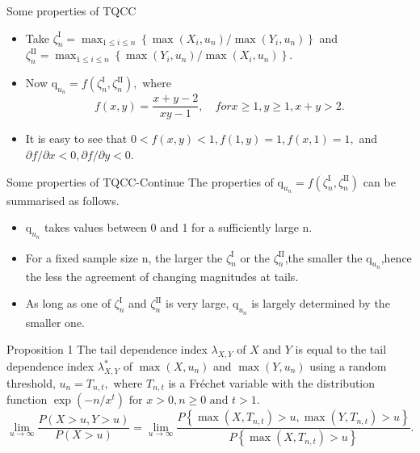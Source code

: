 \documentclass[12pt]{beamer}
\begin{document}
\begin{frame}{Some properties of TQCC}
\begin{itemize}
\item Take $\zeta_{n}^{\mathrm{I}}=\max _{1 \leq i \leq n}\left\{\max \left(X_{i}, u_{n}\right) / \max \left(Y_{i}, u_{n}\right)\right\}$ and $\zeta_{n}^{\mathrm{II}}=\max _{1 \leq i \leq n}\left\{\max \left(Y_{i}, u_{n}\right) / \max \left(X_{i}, u_{n}\right)\right\}$.
\vspace{2ex}
\item Now $\mathrm{q}_{u_{n}}=f\left(\zeta_{n}^{\mathrm{I}}, \zeta_{n}^{\mathrm{II}}\right),$ where
\begin{displaymath}
f(x, y)=\frac{x+y-2}{x y-1}, \quad for x \geq 1, y \geq 1, x+y>2.
\end{displaymath}
\vspace{2ex}
\item It is easy to see that $0<f(x, y)<1, f(1, y)=1, f(x, 1)=1,$ and $\partial f / \partial x <0, \partial f / \partial y <0$.
\end{itemize}
\end{frame}




\begin{frame}{Some properties of TQCC-Continue}
The properties of $\mathrm{q}_{u_{n}}=f \left(\zeta_{n}^{\mathrm{I}}, \zeta_{n}^{\mathrm{II}}\right)$ can be summarised as follows.
\begin{itemize}
\item $\mathrm{q}_{u_{n}}$ takes values between 0 and 1
for a sufficiently large n.
\item For a fixed sample size n, the larger the $\zeta_{n}^{\mathrm{I}}$ or the $\zeta_{n}^{\mathrm{II}}$,the smaller
the $\mathrm{q}_{u_{n}}$,hence the less the agreement of changing magnitudes at tails.
\item As long as one of $\zeta_{n}^{\mathrm{I}}$ and $\zeta_{n}^{\mathrm{II}}$ is very large, $\mathrm{q}_{u_{n}}$ is largely determined by the smaller one.

\end{itemize}
\end{frame}


\begin{frame}{Proposition 1}
The tail dependence index $\lambda_{X,Y}$ of $X$ and $Y$ is equal to the tail dependence index $\lambda^*_{X,Y}$ of $\max \left(X, u_{n}\right)$ and $\max \left(Y, u_{n}\right)$ using a random threshold, $u_n=T_{n,t},$ where $T_{n,t}$ is a Fréchet variable with the distribution function $\exp \left(-n / x^{t}\right) \text { for } x>0, n \geq 0 \text { and } t>1.$
$$\lim _{u \rightarrow \infty} \frac{P(X>u, Y>u)}{P(X>u)}=\lim _{u \rightarrow \infty} \frac{P\left\{\max \left(X, T_{n, t}\right)>u, \max \left(Y, T_{n, t}\right)>u\right\}}{P\left\{\max \left(X, T_{n, t}\right)>u\right\}}.$$
\end{frame}
\end{document}
